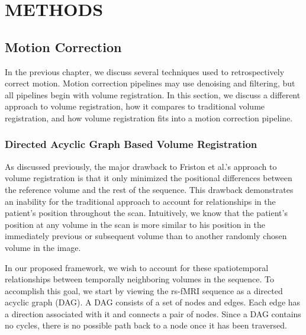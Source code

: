 \chapter{METHODS}
\label{ch:methods}

\section{Motion Correction}

In the previous chapter, we discuss several techniques used to retrospectively correct motion. Motion correction pipelines may use denoising and filtering, but all pipelines begin with volume registration. In this section, we discuss a different approach to volume registration, how it compares to traditional volume registration, and how volume registration fits into a motion correction pipeline. 


\subsection{Directed Acyclic Graph Based Volume Registration}

As discussed previously, the major drawback to Friston et al.'s approach to volume registration is that it only minimized the positional differences between the reference volume and the rest of the sequence. This drawback demonstrates an inability for the traditional approach to account for relationships in the patient's position throughout the scan. Intuitively, we know that the patient's position at any volume in the scan is more similar to his position in the immediately previous or subsequent volume than to another randomly chosen volume in the image.

In our proposed framework, we wish to account for these spatiotemporal relationships between temporally neighboring volumes in the sequence. To accomplish this goal, we start by viewing the rs-fMRI sequence as a directed acyclic graph (DAG). A DAG consists of a set of nodes and edges. Each edge has a direction associated with it and connects a pair of nodes. Since a DAG contains no cycles, there is no possible path back to a node once it has been traversed. 

